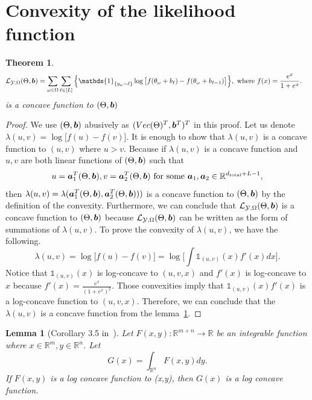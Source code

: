 \documentclass[11pt]{article}
\theoremstyle{plain}
\newtheorem{thm}{Theorem}[section]
\newtheorem{lem}{Lemma}
\theoremstyle{definition}
\begin{document}
\section{Convexity of the likelihood function}
\begin{thm}\label{thm:convexity}
\begin{align}
 \logl(\Theta, \mb)&=\sum_{\omega\in\Omega}\sum_{\ell\in[L]} \Big\{\mathds{1}_{\{y_\omega=\ell\}} \log \big[f(\theta_\omega+b_\ell)-  f(\theta_\omega+b_{\ell-1})\big]\Big\}, \text{ where } f(x) = \frac{e^x}{1+e^x}.
 \end{align}
is a concave function to $(\Theta,\bm{b})$
\end{thm}
\begin{proof}
We use $(\Theta,\bm{b})$ abusively as $(Vec(\Theta)^T,\bm{b}^T)^T$ in this proof.
Let us denote $\lambda(u,v) = \log \big[f(u)-  f(v)\big]$.
It is enough to show that $\lambda(u,v)$
is a concave function to $(u,v)$ where $u>v$. Because if $\lambda(u,v)$ is a concave function and $u,v$ are both linear functions of $(\Theta,\bm{b}) $ such that
$$u = \bm{a}_1^T(\Theta,\bm{b}), v = \bm{a}_2^T(\Theta,\bm{b}) \text{ for some }\bm{a}_1,\bm{a}_2\in \mathbb{R}^{d_{\text{total}}+L-1},$$ then $\lambda(u,v) = \lambda(\bm{a}_1^T(\Theta,\bm{b}),\bm{a}_2^T(\Theta,\bm{b})))$ is a concave function to $(\Theta,\bm{b})$
by the definition of the convexity. Furthermore, we can conclude that $\mathcal{L}_{\mathcal{Y},\Omega}(\Theta, \bm{b}) $ is a concave function to $(\Theta,\bm{b})$ because $\mathcal{L}_{\mathcal{Y},\Omega}(\Theta, \bm{b})$
can be written as the form of summations of $\lambda(u,v)$. To prove the convexity of $\lambda(u,v)$, we have the following.
\begin{equation*}
\lambda(u,v) = \log\big[f(u)-f(v)\big]=\log\big[\int\mathds{1}_{(u,v)}(x)f'(x)dx\big].
\end{equation*}
Notice that  $\mathds{1}_{(u,v)}(x)$ is log-concave to $(u,v,x)$ and $f'(x)$ is log-concave to $x$ because $f'(x) = \frac{e^x}{(1+e^x)^2}$. Those convexities imply that $\mathds{1}_{(u,v)}(x)f'(x)$
is a log-concave function to $(u,v,x)$. Therefore, we can conclude that the $\lambda(u,v)$ is a concave function from the lemma~\ref{lem:lossconvexity}.
\end{proof}

\begin{lem}[Corollary 3.5 in~\cite{brascamp2002extensions}]\label{lem:lossconvexity}
Let $F(x,y):\mathbb{R}^{m+n}\rightarrow \mathbb{R}$ be an integrable function where $x\in \mathbb{R}^{m},y\in \mathbb{R}^n$. Let $$G(x) = \int_{\mathbb{R}^n}F(x,y)dy.$$ If $F(x,y)$ is a log concave function to (x,y), then $G(x)$ is a log concave function.
\end{lem}
\end{document}
